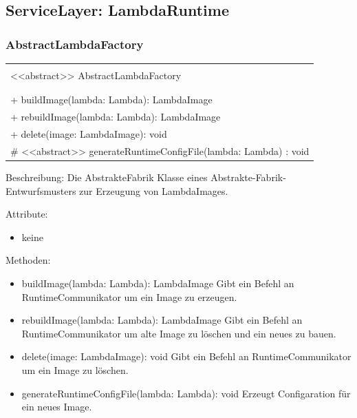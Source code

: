 \documentclass[a4paper,20pt,oneside]{book}
\begin{document}
	
\subsection{ServiceLayer: LambdaRuntime}
	\subsubsection{AbstractLambdaFactory}
	\centering
	\begin{tabular}{|l|}
	\hline \\
	<<abstract>> AbstractLambdaFactory \\
	\hline \\
	
	\hline \\
	+ buildImage(lambda: Lambda): LambdaImage \\
	+ rebuildImage(lambda: Lambda): LambdaImage \\
	+ delete(image: LambdaImage): void \\
	\# <<abstract>> generateRuntimeConfigFile(lambda: Lambda) : void \\
	\hline 
	\end{tabular}
	
	\raggedright
	\vspace{0.5cm}
	
	Beschreibung: Die AbstrakteFabrik Klasse eines Abstrakte-Fabrik-Entwurfsmusters zur Erzeugung von LambdaImages.
	\vspace{0.5cm}	
	
	Attribute:
	\begin{itemize}
	\item keine
	\end{itemize}
	
	Methoden:
	\begin{itemize}
	\item buildImage(lambda: Lambda): LambdaImage
	\linebreak Gibt ein Befehl an RuntimeCommunikator um ein Image zu erzeugen.
	\item rebuildImage(lambda: Lambda): LambdaImage
	\linebreak Gibt ein Befehl an RuntimeCommunikator um alte Image zu löschen und ein neues zu bauen.
	\item delete(image: LambdaImage): void
	\linebreak Gibt ein Befehl an RuntimeCommunikator um ein Image zu löschen.
	\item generateRuntimeConfigFile(lambda: Lambda): void
	\linebreak
	Erzeugt Configaration für ein neues Image.
	\end{itemize}
		
\end{document}

